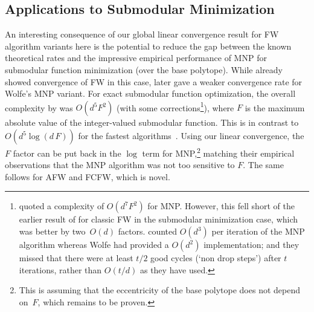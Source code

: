 \documentclass{article} %
\newcommand{\0}{\mathbf{0}} %
\begin{document}
\subsection{Applications to Submodular Minimization} \label{app:submodular}
An interesting consequence of our global linear convergence result for FW algorithm variants here is the potential to reduce the gap between the known
theoretical rates and the impressive empirical performance of MNP for submodular
function minimization (over the base polytope). 
While \citet{Bach:2013et} already showed convergence of FW in this case,  later gave a weaker convergence rate for Wolfe's MNP variant.
For exact submodular function optimization, the overall complexity by  was $O(d^5 F^2)$ 
(with some corrections\footnote{ quoted a complexity of $O(d^7 F^2)$ for MNP.
However, this fell short of the earlier result of \citet{Bach:2013et} for
classic FW in the submodular minimization case, which was better by two~$O(d)$ factors.  counted $O(d^3)$ per iteration
of the MNP algorithm whereas Wolfe had provided a $O(d^2)$ implementation;
and they missed that there were at least $t/2$ good cycles (`non drop steps')
after $t$ iterations, rather than $O(t/d)$ as they have used.
}), where
$F$ is the maximum absolute value of the integer-valued submodular
function.
This is in contrast to $O(d^5 \log(d \, F))$ for the fastest
algorithms~. 
Using our linear convergence, the $F$ factor can be put back in the $\log$ term for 
MNP,\footnote{This is assuming that the eccentricity of the base polytope
does not depend on~$F$, which remains to be proven.}
matching their empirical observations that the MNP algorithm was not too 
sensitive to $F$. The same follows for AFW and FCFW, which is novel.
%
%
\end{document}
